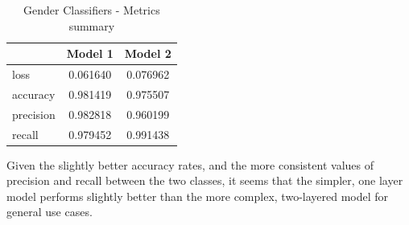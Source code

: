 \documentclass[11pt, letterpaper]{article}
\begin{document}
\begin{table}[h]
\begin{center}
\caption{Gender Classifiers - Metrics summary}
\begin{tabular}{l c c}
& 	Model 1 & Model 2 \\ \hline
loss	&0.061640 & 0.076962 \\
accuracy& 0.981419 & 0.975507 \\
precision & 0.982818 & 0.960199 \\
recall & 0.979452 & 0.991438 \\
\end{tabular}
\label{tab:GenMetricsSum}
\end{center}
\end{table} 

Given the slightly better accuracy rates, and the more consistent values of precision and recall between the two classes, it seems that the simpler, one layer model performs slightly better than the more complex, two-layered model for general use cases.





\end{document}
